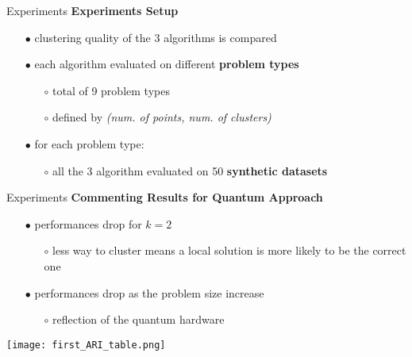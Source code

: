 		\begin{frame}{Experiments}
			\textbf{Experiments Setup}
			\begin{itemize}
				\item[$\bullet$] clustering quality of the 3 algorithms is compared
				\item[$\bullet$] each algorithm evaluated on different \textbf{problem types}
				\begin{itemize}
					\item[$\circ$] total of 9 problem types 
					\item[$\circ$] defined by \textit{(num. of points, num. of clusters)}
				\end{itemize}
				\item[$\bullet$] for each problem type:
				\begin{itemize}
					\item[$\circ$]  all the 3 algorithm evaluated on 50 \textbf{synthetic datasets}
				\end{itemize}

			\end{itemize}
			
		\end{frame}

		\begin{frame}{Experiments}
			\textbf{Commenting Results for Quantum Approach}
			\begin{itemize}
				\item[$\bullet$] performances drop for $k=2$
				\begin{itemize}
					\item[$\circ$] less way to cluster means a local solution is more likely to be the correct one
				\end{itemize}
				\item[$\bullet$] performances drop as the problem size increase 
				\begin{itemize}
					\item[$\circ$] reflection of the quantum hardware
				\end{itemize}
			\end{itemize}

			\begin{center}
				\texttt{[image: first\_ARI\_table.png]}
			\end{center}
		\end{frame}

